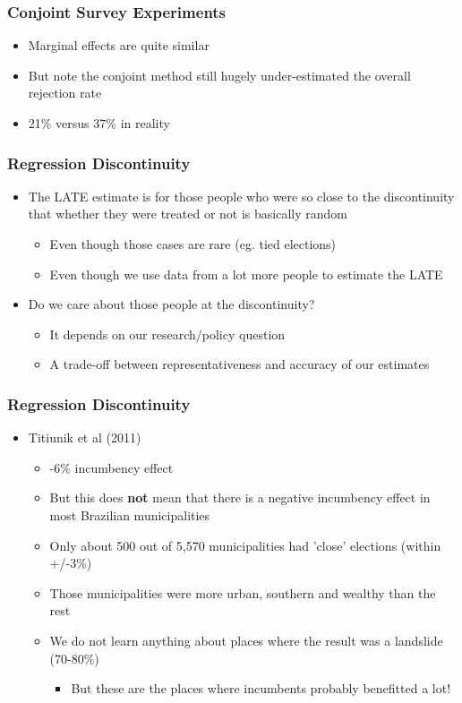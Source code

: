 \documentclass[xcolor=x11names,compress]{beamer}\usepackage[]{graphicx}\usepackage[]{xcolor}
\renewcommand{\(}{\begin{columns}}
\renewcommand{\)}{\end{columns}}
\newcommand{\<}[1]{\begin{column}{#1}}
\renewcommand{\>}{\end{column}}
\begin{document}
\begin{frame}
\frametitle{Conjoint Survey Experiments}
\begin{itemize}
\item Marginal effects are quite similar
\pause
\item But note the conjoint method still hugely under-estimated the overall rejection rate
\item 21\% versus 37\% in reality
\end{itemize}
\end{frame}

\begin{frame}
\frametitle{Regression Discontinuity}
\begin{itemize}
\item The LATE estimate is for those people who were so close to the discontinuity that whether they were treated or not is basically random
\pause
\begin{itemize}
\item Even though those cases are rare (eg. tied elections)
\pause
\item Even though we use data from a lot more people to estimate the LATE
\pause
\end{itemize}
\item Do we care about those people at the discontinuity?
\pause
\begin{itemize}
\item It depends on our research/policy question
\pause
\item A trade-off between representativeness and accuracy of our estimates
\end{itemize}
\end{itemize}
\end{frame}

\begin{frame}
\frametitle{Regression Discontinuity}
\begin{itemize}
\item Titiunik et al (2011) 
\pause
\begin{itemize}
\item -6\% incumbency effect
\pause
\item But this does \textbf{not} mean that there is a negative incumbency effect in most Brazilian municipalities
\pause
\item Only about 500 out of 5,570 municipalities had 'close' elections (within +/-3\%)
\pause
\item Those municipalities were more urban, southern and wealthy than the rest
\pause
\item We do not learn anything about places where the result was a landslide (70-80\%)
\pause
\begin{itemize}
\item But these are the places where incumbents probably benefitted a lot!
\end{itemize}
\end{itemize}
\end{itemize}
\end{frame}
\end{document}
